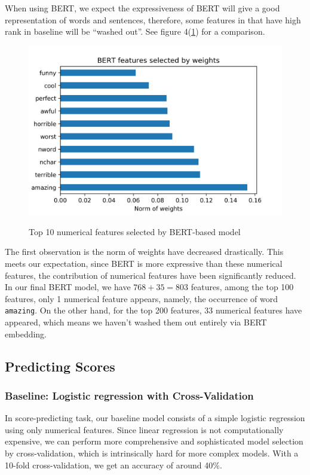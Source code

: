 \documentclass{article}
\begin{document}
When using BERT, we expect the expressiveness of BERT will give a good
representation of words and sentences, therefore, some features in that
have high rank in baseline will be ``washed out''. See figure 4(\ref{fig4}) for a 
comparison.
\begin{figure}
\begin{center}
\label{fig4}
\includegraphics[scale=0.6]{top_10_bert}
\caption{Top 10 numerical features selected by BERT-based model}
\end{center}
\end{figure}
The first observation is the norm of weights have decreased drastically. This
meets our expectation, since BERT is more expressive than these numerical
features, the contribution of numerical features have been significantly 
reduced. In our final BERT model, we have $768+35=803$ features, among
the top 100 features, only 1 numerical feature appears, namely, the 
occurrence of word \texttt{amazing}. On the other hand, for the top 200
features, 33 numerical features have appeared, which means we haven't
washed them out entirely via BERT embedding. 
\subsection{Predicting Scores}
\subsubsection{Baseline: Logistic regression with Cross-Validation}
In score-predicting task, our baseline model consists of a simple logistic 
regression using only numerical features. Since linear regression is not computationally expensive, we can perform more 
comprehensive and sophisticated model selection by cross-validation, which
is intrinsically hard for more complex models. With a 10-fold 
cross-validation, we get an accuracy of around 40\%.
\end{document}
